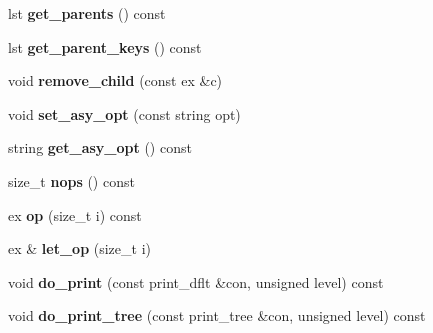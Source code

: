 \begin{DoxyCompactItemize}
\mbox{\label{class_moeb_inv_1_1cycle__node_a73f295b9f0371810e5bb39433390ee9a}} 
lst {\bfseries get\+\_\+parents} () const
\item 
\mbox{\label{class_moeb_inv_1_1cycle__node_ab27247598c10f8556c3e17b1a0bd8cde}} 
lst {\bfseries get\+\_\+parent\+\_\+keys} () const
\item 
\mbox{\label{class_moeb_inv_1_1cycle__node_a265752f76a34351411dbfaac7ec8c1f0}} 
void {\bfseries remove\+\_\+child} (const ex \&c)
\item 
\mbox{\label{class_moeb_inv_1_1cycle__node_a6112cb6ef1b734d8c04d487c0eb1d1d4}} 
void {\bfseries set\+\_\+asy\+\_\+opt} (const string opt)
\item 
\mbox{\label{class_moeb_inv_1_1cycle__node_ac393d7c09b5a3562f94747bf4c08e583}} 
string {\bfseries get\+\_\+asy\+\_\+opt} () const
\item 
\mbox{\label{class_moeb_inv_1_1cycle__node_a968b7445796d9e39e5e7465b474592cc}} 
size\+\_\+t {\bfseries nops} () const
\item 
\mbox{\label{class_moeb_inv_1_1cycle__node_a7e3343b22ec8eb7227c972e3d3e71629}} 
ex {\bfseries op} (size\+\_\+t i) const
\item 
\mbox{\label{class_moeb_inv_1_1cycle__node_a29f0d4cb1c6619b47fcb1a0140e4ad6e}} 
ex \& {\bfseries let\+\_\+op} (size\+\_\+t i)
\item 
\mbox{\label{class_moeb_inv_1_1cycle__node_a0e8ec9fed46c1a638806e6bb3b61fbdd}} 
void {\bfseries do\+\_\+print} (const print\+\_\+dflt \&con, unsigned level) const
\item 
\mbox{\label{class_moeb_inv_1_1cycle__node_a9fcb6b771522b61b18c702be59d4a7e3}} 
void {\bfseries do\+\_\+print\+\_\+tree} (const print\+\_\+tree \&con, unsigned level) const
\item 
\mbox{\label{class_moeb_inv_1_1cycle__node_a83414b9efe3191e16679f5cd91f96125}} 

\end{DoxyCompactItemize}
